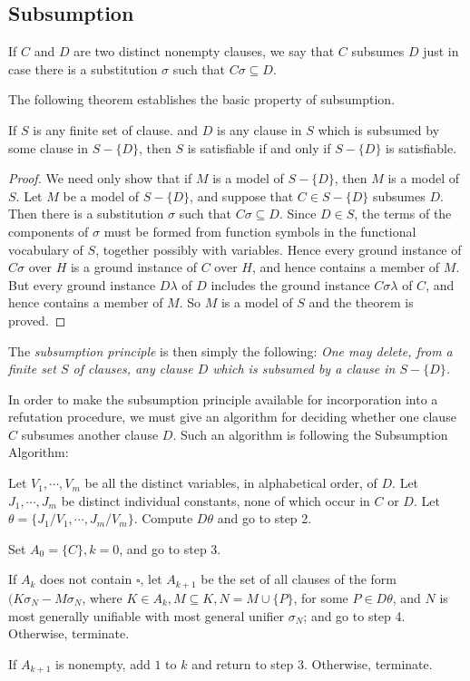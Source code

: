 \documentclass[8pt]{extarticle}
\providecommand{\customgenericname}{}
\newcommand{\newcustomtheorem}[2]{%
  \newenvironment{#1}[1]
  {%
   \renewcommand\customgenericname{#2}%
   \renewcommand\theinnercustomgeneric{##1}%
   \innercustomgeneric
  }
  {\endinnercustomgeneric}
}
\begin{document}
\subsection{Subsumption}
If $C$ and $D$ are two distinct nonempty clauses, we say 
that $C$ subsumes $D$ just in case there is a substitution $\sigma$ such that $C\sigma\subseteq D$.

The following theorem establishes the basic property of subsumption. 

\newcustomtheorem{p16theorem}{}
\begin{p16theorem}{Subsumption Theorem}
If $S$ is any finite set of clause. and $D$ is any clause in $S$ which is subsumed by some clause in $S - \{D\}$, then $S$ is satisfiable if and only if $S - \{D\}$ is satisfiable.
\end{p16theorem}
\begin{proof}
We need only show that if $M$ is a model of $S - \{D\}$, then $M$ is a model of $S$. Let $M$ be a model of $S - \{D\}$, and suppose that $C \in S - \{D\}$ subsumes $D$. Then there is a substitution $\sigma$ such that $C\sigma\subseteq D$. Since $D \in S$, the 
terms of the components of $\sigma$ must be formed from function symbols in the functional vocabulary of $S$, together possibly with variables. Hence every ground instance of $C\sigma$ over $H$ is a ground instance of $C$ over $H$, and hence contains a 
member of $M$. But every ground instance $D\lambda$ of $D$ includes the ground instance $C\sigma\lambda$ of $C$, and hence contains a member of $M$. So $M$ is a model of $S$ and the theorem is proved. 

\end{proof}


The \emph{subsumption principle} is then simply the following: \emph{One may delete, from a
finite set $S$ of clauses, any clause $D$ which is subsumed by a clause in $S - \{D\}$.}

In order to make the subsumption principle available for incorporation into a 
refutation procedure, we must give an algorithm for deciding whether one clause $C$ 
subsumes another clause $D$. Such an algorithm is following the Subsumption Algorithm:

\begin{steps}
    \item Let $V_1,\dotsm,V_m$ be all the distinct variables, in alphabetical order, of $D$. Let $J_1,\dotsm,J_m$ be distinct individual constants, none of which occur in $C$ or $D$. Let $\theta = \{J_1/V_1,\dotsm,J_m/V_m\}$. Compute $D\theta$ and go to step 2.
    \item Set $A_0 = \{C\}, k = 0$, and go to step 3.
    \item If $A_k$ does not contain $\square$, let $A_{k+1}$ be the set of all clauses of the form $(K\sigma_N - M\sigma_N$, where $K \in A_k, M\subseteq K, N = M \cup \{P\}$, for some $P \in D\theta$, and $N$ is most generally unifiable with most general unifier $\sigma_N$; and go to step 4. Otherwise, terminate.
    \item If $A_{k+1}$ is nonempty, add $1$ to $k$ and return to step 3. Otherwise, terminate.
\end{steps}
\end{document}
